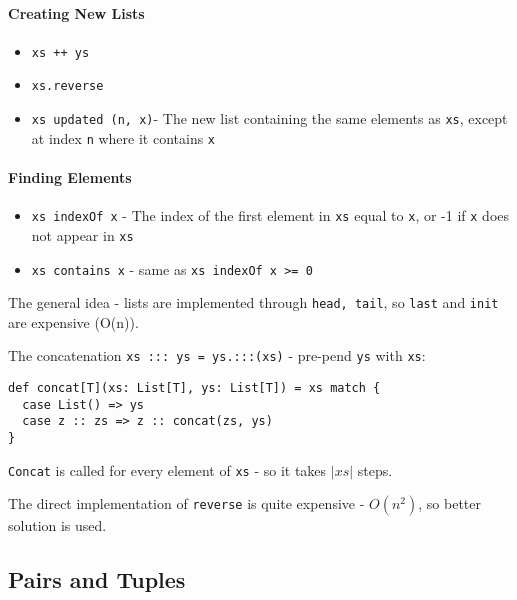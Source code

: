 \documentclass{scrartcl}
\begin{document}
\paragraph{Creating New Lists}
\begin{itemize}
\item \lstinline|xs ++ ys| 
\item \lstinline|xs.reverse|
\item \lstinline|xs updated (n, x)|- The new list containing the same elements
  as \lstinline|xs|, except at index \lstinline|n| where it contains
  \lstinline|x|
\end{itemize}

\paragraph{Finding Elements}
\begin{itemize}
\item \lstinline|xs indexOf x| - The index of the first element in \lstinline|xs|
  equal to \lstinline|x|, or -1 if \lstinline|x| does not appear in
  \lstinline|xs| 
\item \lstinline|xs contains x| - same as \lstinline|xs indexOf x >= 0|
\end{itemize}

The general idea - lists are implemented through \lstinline|head, tail|, so
\lstinline|last| and \lstinline|init| are expensive (O(n)).

The concatenation \lstinline|xs ::: ys = ys.:::(xs)| - pre-pend \lstinline|ys|
with \lstinline|xs|:
\begin{lstlisting}
def concat[T](xs: List[T], ys: List[T]) = xs match {
  case List() => ys
  case z :: zs => z :: concat(zs, ys)
}
\end{lstlisting}
\lstinline|Concat| is called for every element of \lstinline|xs| - so it takes
$|xs|$ steps.

The direct implementation of \lstinline|reverse| is quite expensive - $O(n^2)$,
so better solution is used.

\subsection{Pairs and Tuples}
\label{sec:PairsAndTuples}
\end{document}
